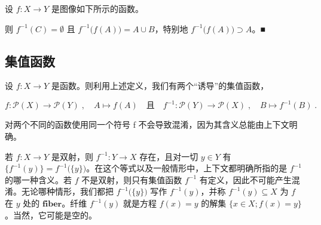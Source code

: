 \begin{example}

设 $f: X \to Y$ 是图像如下所示的函数。


则 $ f^{-1}(C) = \emptyset $ 且 $ f^{-1}\big(f(A)\big) = A \cup B $，特别地 $ f^{-1}\big(f(A)\big) \supset A $。■

\end{example}

\subsection*{集值函数}

设 $ f: X \to Y $ 是函数。则利用上述定义，我们有两个“诱导”的集值函数，

\[
f\colon\mathcal{P}(X)\to\mathcal{P}(Y)\;,\quad A\mapsto f(A)\quad\text{且}\quad f^{-1}\colon\mathcal{P}(Y)\to\mathcal{P}(X)\;,\quad B\mapsto f^{-1}(B)\;.
\]

对两个不同的函数使用同一个符号 f 不会导致混淆，因为其含义总能由上下文明确。

若 $f: X \to Y$ 是双射，则 $f^{-1}: Y \to X$ 存在，且对一切 $y \in Y$ 有 $\{f^{-1}(y)\} = f^{-1}\big(\{y\}\big)$。在这个等式以及一般情形中，上下文都明确所指的是 $f^{-1}$ 的哪一种含义。若 $f$ 不是双射，则只有集值函数 $f^{-1}$ 有定义，因此不可能产生混淆。无论哪种情形，我们都把 $f^{-1}\big(\{y\}\big)$ 写作 $f^{-1}(y)$，并称 $f^{-1}(y) \subseteq X$ 为 $f$ 在 $y$ 处的 $\mathbf{fiber}$。纤维 $f^{-1}(y)$ 就是方程 $f(x) = y$ 的解集 $\{x \in X; f(x) = y\}$。当然，它可能是空的。

